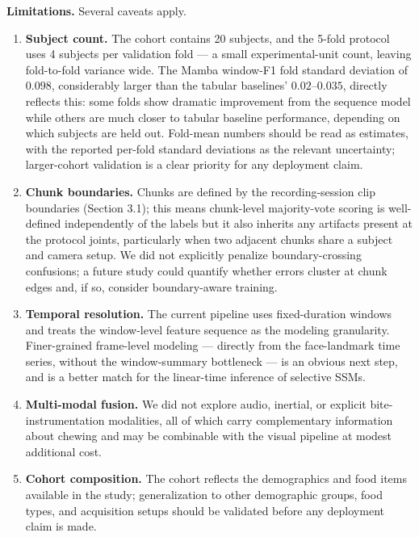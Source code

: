 \documentclass{article}
\begin{document}
\textbf{Limitations.} Several caveats apply.

\begin{enumerate}
    \item \textbf{Subject count.} The cohort contains 20 subjects, and the 5-fold protocol uses 4 subjects per validation fold --- a small experimental-unit count, leaving fold-to-fold variance wide. The Mamba window-F1 fold standard deviation of $0.098$, considerably larger than the tabular baselines' $0.02$--$0.035$, directly reflects this: some folds show dramatic improvement from the sequence model while others are much closer to tabular baseline performance, depending on which subjects are held out. Fold-mean numbers should be read as estimates, with the reported per-fold standard deviations as the relevant uncertainty; larger-cohort validation is a clear priority for any deployment claim.

    \item \textbf{Chunk boundaries.} Chunks are defined by the recording-session clip boundaries (Section 3.1); this means chunk-level majority-vote scoring is well-defined independently of the labels but it also inherits any artifacts present at the protocol joints, particularly when two adjacent chunks share a subject and camera setup. We did not explicitly penalize boundary-crossing confusions; a future study could quantify whether errors cluster at chunk edges and, if so, consider boundary-aware training.

    \item \textbf{Temporal resolution.} The current pipeline uses fixed-duration windows and treats the window-level feature sequence as the modeling granularity. Finer-grained frame-level modeling --- directly from the face-landmark time series, without the window-summary bottleneck --- is an obvious next step, and is a better match for the linear-time inference of selective SSMs.

    \item \textbf{Multi-modal fusion.} We did not explore audio, inertial, or explicit bite-instrumentation modalities, all of which carry complementary information about chewing and may be combinable with the visual pipeline at modest additional cost.

    \item \textbf{Cohort composition.} The cohort reflects the demographics and food items available in the study; generalization to other demographic groups, food types, and acquisition setups should be validated before any deployment claim is made.


\end{enumerate}
\end{document}
